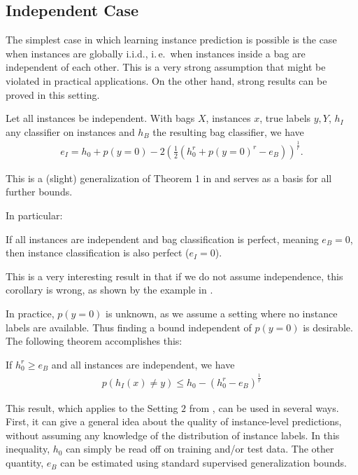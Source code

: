 \subsection{Independent Case}
The simplest case in which learning instance prediction is possible is the case when instances are globally i.i.d.,
i.\,e.\ when instances inside a bag are independent of each other. This is a very strong assumption that might be
violated in practical applications. On the other hand, strong results can be proved in this setting.

\begin{theorem}\label{basicthm}
Let all instances be independent. With bags $X$, instances $x$, true labels $y,Y$, $h_I$ any classifier
on instances and $h_B$ the resulting bag classifier, we have
\begin{align*}
   e_I = h_0 + p(y=0) - 2 \left (\frac{1}{2} ( h_0^r + p(y=0)^r - e_B) \right)^\frac{1}{r}.
\end{align*}
\end{theorem}
This is a (slight) generalization of Theorem 1 in \citet{sabato2010reducing} and serves as a basis for all further bounds. 

In particular:
\begin{corollary}\label{perfect}
If all instances are independent and bag classification is perfect, meaning $e_B=0$, then instance classification is also perfect ($e_I =0$).
\end{corollary}
This is a very interesting result in that if we do not assume independence, this corollary is wrong,
as shown by the example in .

In practice, $p(y=0)$ is unknown, as we assume a setting where no instance labels are available.
Thus finding a bound independent of $p(y=0)$ is desirable. The following theorem accomplishes this:

\begin{theorem}\label{iidbound}
If $h_0^r  \geq e_B$ and all instances are independent, we have
\begin{align}
    p(h_I(x)\neq y) \leq h_0 - \left ( h_0^r - e_B \right ) ^ \frac{1}{r}
\end{align}
\end{theorem}

This result, which applies to the Setting $2$ from ,
can be used in several ways. First, it can give a general idea about the quality of instance-level
predictions, without assuming any knowledge of the distribution of instance labels. In this inequality,
$h_0$ can simply be read off on training and/or test data. The other quantity, $e_B$ can be
estimated using standard supervised generalization bounds.

